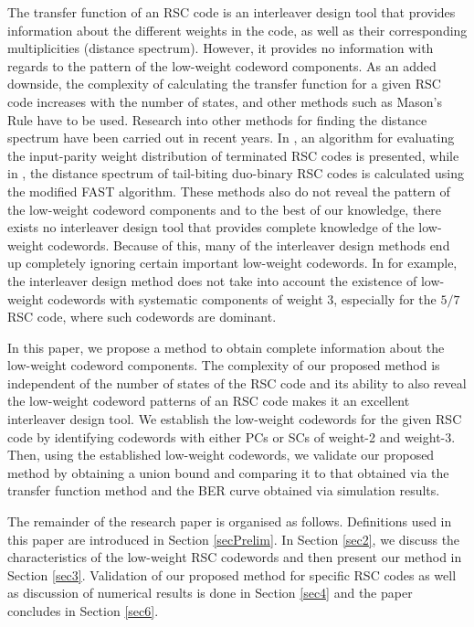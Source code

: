 The transfer function of an RSC code is an interleaver design tool that provides information about the different weights in the code, as well as their corresponding multiplicities (distance spectrum). 
However, it provides no information with regards to the pattern of the low-weight codeword components. As an added downside, the complexity of calculating the transfer function for a given RSC code increases with the number of states, and other methods such as Mason's Rule \cite{Moon05B} have to be used. Research into other methods for finding the distance spectrum have been carried out in recent years.  In \cite{Lu16-10C}, an algorithm for evaluating the input-parity weight distribution of
terminated RSC codes is presented, while in \cite{Deng17-01C}, the distance spectrum of tail-biting duo-binary
RSC codes is calculated using the modified FAST algorithm. These methods also do not reveal the pattern of the low-weight codeword components and to the best of our knowledge, there exists no interleaver design tool that provides complete knowledge of the low-weight codewords. Because of this, many of the interleaver design methods end up completely ignoring certain important low-weight codewords. In \cite{Sun05-01J} for example, the interleaver design method does not take into account the existence of low-weight codewords with systematic components of weight 3, especially for the $5/7$  RSC code, where such codewords are dominant.

In this paper, we propose a method to obtain complete information about the low-weight codeword components. The complexity of our proposed method is independent of the number of states of the RSC code and its ability to also reveal the low-weight codeword patterns of an RSC code makes it an excellent interleaver design tool.
We establish the low-weight codewords for the given RSC code by identifying codewords with either PCs or SCs of weight-2 and weight-3. Then, using the established low-weight codewords, we validate our proposed method by obtaining a union bound and comparing it to that obtained via the transfer function method and the BER curve obtained via simulation results.

The remainder of the research paper is organised as follows. Definitions used in this paper are introduced in Section \ref{secPrelim}. In Section \ref{sec2}, we discuss the characteristics of the low-weight RSC codewords and then present our method in Section \ref{sec3}. Validation of our proposed method for specific RSC codes as well as discussion of numerical results is done in Section \ref{sec4} and the paper concludes in Section \ref{sec6}.

